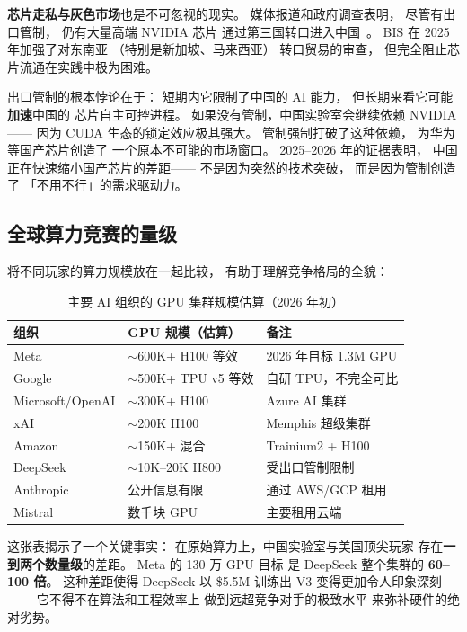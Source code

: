 \textbf{芯片走私与灰色市场}也是不可忽视的现实。
媒体报道和政府调查表明，
尽管有出口管制，
仍有大量高端 NVIDIA 芯片
通过第三国转口进入中国~\cite{harithas2024chipsmuggling}。
BIS 在 2025 年加强了对东南亚
（特别是新加坡、马来西亚）
转口贸易的审查，
但完全阻止芯片流通在实践中极为困难。

\begin{warnbox}[出口管制的长期博弈]
出口管制的根本悖论在于：
短期内它限制了中国的 AI 能力，
但长期来看它可能\textbf{加速}中国的
芯片自主可控进程。
如果没有管制，中国实验室会继续依赖 NVIDIA——
因为 CUDA 生态的锁定效应极其强大。
管制强制打破了这种依赖，
为华为等国产芯片创造了
一个原本不可能的市场窗口。
2025--2026 年的证据表明，
中国正在快速缩小国产芯片的差距——
不是因为突然的技术突破，
而是因为管制创造了
「不用不行」的需求驱动力。
\end{warnbox}

\subsection{全球算力竞赛的量级}

将不同玩家的算力规模放在一起比较，
有助于理解竞争格局的全貌：

\begin{table}[H]
\centering\small
\caption{主要 AI 组织的 GPU 集群规模估算（2026 年初）}
\begin{tabularx}{\linewidth}{l l X}
\toprule
\textbf{组织} & \textbf{GPU 规模（估算）} & \textbf{备注} \\
\midrule
Meta & $\sim$600K+ H100 等效 & 2026 年目标 1.3M GPU \\
Google & $\sim$500K+ TPU v5 等效 & 自研 TPU，不完全可比 \\
Microsoft/OpenAI & $\sim$300K+ H100 & Azure AI 集群 \\
xAI & $\sim$200K H100 & Memphis 超级集群 \\
Amazon & $\sim$150K+ 混合 & Trainium2 + H100 \\
DeepSeek & $\sim$10K--20K H800 & 受出口管制限制 \\
Anthropic & 公开信息有限 & 通过 AWS/GCP 租用 \\
Mistral & 数千块 GPU & 主要租用云端 \\
\bottomrule
\end{tabularx}
\end{table}

这张表揭示了一个关键事实：
在原始算力上，中国实验室与美国顶尖玩家
存在\textbf{一到两个数量级}的差距。
Meta 的 130 万 GPU 目标
是 DeepSeek 整个集群的 \textbf{60--100 倍}。
这种差距使得 DeepSeek 以 \$5.5M 训练出 V3
变得更加令人印象深刻——
它不得不在算法和工程效率上
做到远超竞争对手的极致水平
来弥补硬件的绝对劣势。

